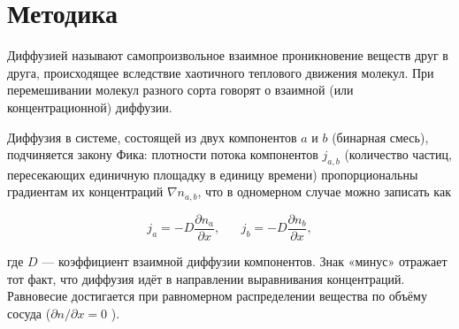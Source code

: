 \chapter{Методика}
\label{ch:methods}

Диффузией  называют самопроизвольное взаимное проникновение веществ друг в друга, происходящее вследствие хаотичного теплового движения молекул. При перемешивании молекул разного сорта говорят о взаимной (или концентрационной) диффузии.

Диффузия в системе, состоящей из двух компонентов $a$ и $b$ (бинарная смесь), подчиняется закону Фика: плотности потока компонентов $j_{a ,b}$ (количество частиц, пересекающих единичную площадку в единицу времени) пропорциональны градиентам их концентраций $\nabla n_{a , b}$, что в одномерном случае можно записать как

\[j_a = -D \frac{\partial n_a}{\partial x}, \hspace{20pt} j_b = -D \frac{\partial n_b}{\partial x},\]

где $D$ — коэффициент взаимной диффузии компонентов. Знак «минус» отражает тот факт, что диффузия идёт в направлении выравнивания концентраций. Равновесие достигается при равномерном распределении вещества по объёму сосуда ($ \partial n /\partial x = 0$ ).
